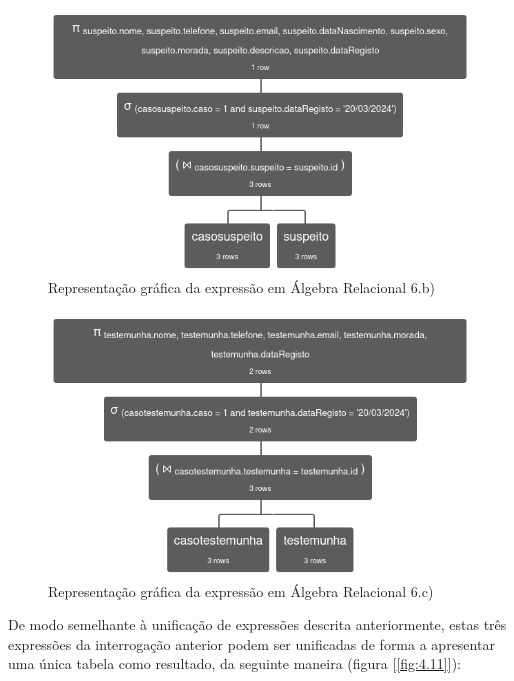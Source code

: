 \documentclass[a4paper,12pt]{scrreprt}
\begin{document}
\begin{figure}[!ht]
    \centering
    \includegraphics[scale=0.692]{images/relax/6-b.png}
    \caption{Representação gráfica da expressão em Álgebra Relacional 6.b)}
    \label{fig:4.9}
\end{figure}
\vspace{0cm}
\begin{figure}[!ht]
    \centering
    \includegraphics[scale=0.692]{images/relax/6-c.png}
    \caption{Representação gráfica da expressão em Álgebra Relacional 6.c)}
    \label{fig:4.10}
\end{figure}

\clearpage

De modo semelhante à unificação de expressões descrita anteriormente, estas três expressões da interrogação anterior podem ser unificadas de forma a apresentar uma única tabela como resultado, da seguinte maneira (figura [\ref{fig:4.11}]):
\end{document}
